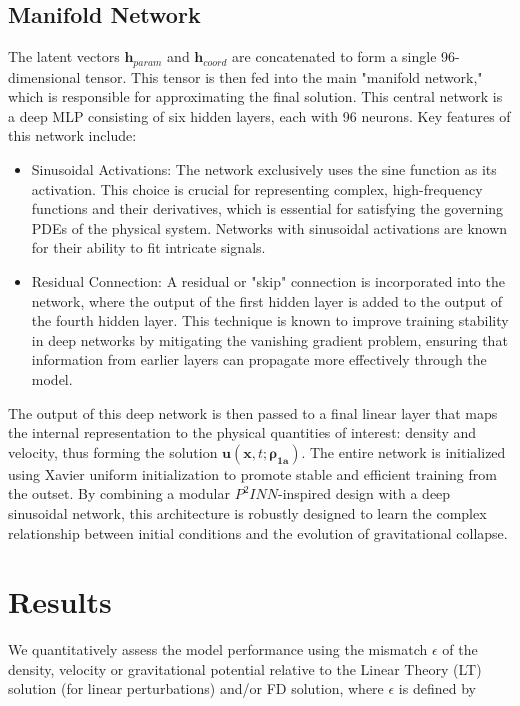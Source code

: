 \documentclass{article}
\begin{document}
\subsection{Manifold Network}
The latent vectors $\mathbf{h}_{param}$ and $\mathbf{h}_{coord}$ are concatenated to form a single 96-dimensional tensor. This tensor is then fed into the main "manifold network," which is responsible for approximating the final solution. This central network is a deep MLP consisting of six hidden layers, each with 96 neurons. Key features of this network include:
\begin{itemize}
    \item Sinusoidal Activations: The network exclusively uses the sine function as its activation. This choice is crucial for representing complex, high-frequency functions and their derivatives, which is essential for satisfying the governing PDEs of the physical system. Networks with sinusoidal activations are known for their ability to fit intricate signals.
    \item Residual Connection: A residual or "skip" connection is incorporated into the network, where the output of the first hidden layer is added to the output of the fourth hidden layer. This technique is known to improve training stability in deep networks by mitigating the vanishing gradient problem, ensuring that information from earlier layers can propagate more effectively through the model.
\end{itemize}

 The output of this deep network is then passed to a final linear layer that maps the internal representation to the physical quantities of interest: density and velocity, thus forming the solution $\mathbf{u}(\mathbf{x}, t; \boldsymbol{\rho_{1a}})$. The entire network is initialized using Xavier uniform initialization to promote stable and efficient training from the outset. By combining a modular ${P^2INN}$-inspired design with a deep sinusoidal network, this architecture is robustly designed to learn the complex relationship between initial conditions and the evolution of gravitational collapse.

 \section{Results}
 We quantitatively assess the model performance using the mismatch $\epsilon$ of the density, velocity or gravitational potential relative to the Linear Theory (LT) solution (for linear perturbations) and/or FD solution, where $\epsilon$ is defined by
\end{document}
